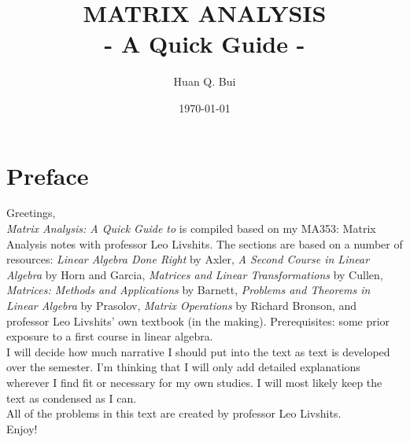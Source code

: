 \documentclass{book}
\theoremstyle{definition}
\begin{document}
	\begin{titlepage}\centering
		\clearpage
		\title{\textsc{\bf{MATRIX ANALYSIS}}\\\smallskip - A Quick Guide -\\}
		\author{\bigskip Huan Q. Bui}
		\date{\today}
		\maketitle
		\thispagestyle{empty}
	\end{titlepage}

\newpage

\section*{Preface}

Greetings,\\

\textit{Matrix Analysis: A Quick Guide to} is compiled based on my MA353: Matrix Analysis notes with professor Leo Livshits. The sections are based on a number of resources: \textit{Linear Algebra Done Right} by Axler, \textit{A Second Course in Linear Algebra} by Horn and Garcia, \textit{Matrices and Linear Transformations} by Cullen, \textit{Matrices: Methods and Applications} by Barnett, \textit{Problems and Theorems in Linear Algebra} by Prasolov, \textit{Matrix Operations} by Richard Bronson, and professor Leo Livshits' own textbook (in the making). Prerequisites: some prior exposure to a first course in linear algebra.\\ 

I will decide how much narrative I should put into the text as text is developed over the semester. I'm thinking that I will only add detailed explanations wherever I find fit or necessary for my own studies. I will most likely keep the text as condensed as I can.\\



All of the problems in this text are created by professor Leo Livshits.\\

Enjoy!
\end{document}
